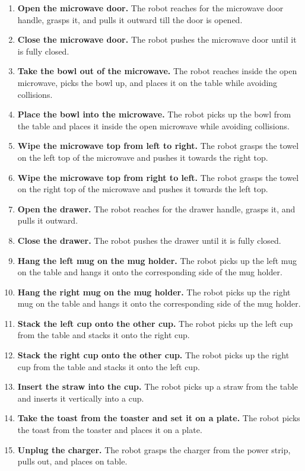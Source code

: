 \documentclass{llmxive}
\begin{document}
\begin{enumerate}[leftmargin=1.6em,itemsep=0.1em]
    \item \textbf{Open the microwave door.} The robot reaches for the microwave door handle, grasps it, and pulls it outward till the door is opened.
    \item \textbf{Close the microwave door.} The robot pushes the microwave door until it is fully closed.
    \item \textbf{Take the bowl out of the microwave.} The robot reaches inside the open microwave, picks the bowl up, and places it on the table while avoiding collisions.
    \item \textbf{Place the bowl into the microwave.} The robot picks up the bowl from the table and places it inside the open microwave while avoiding collisions.
    \item \textbf{Wipe the microwave top from left to right.} The robot grasps the towel on the left top of the microwave and pushes it towards the right top.
    \item \textbf{Wipe the microwave top from right to left.} The robot grasps the towel on the right top of the microwave and pushes it towards the left top.
    \item \textbf{Open the drawer.} The robot reaches for the drawer handle, grasps it, and pulls it outward.
    \item \textbf{Close the drawer.} The robot pushes the drawer until it is fully closed.
    \item \textbf{Hang the left mug on the mug holder.} The robot picks up the left mug on the table and hangs it onto the corresponding side of the mug holder.
    \item \textbf{Hang the right mug on the mug holder.} The robot picks up the right mug on the table and hangs it onto the corresponding side of the mug holder.
    \item \textbf{Stack the left cup onto the other cup.} The robot picks up the left cup from the table and stacks it onto the right cup.
    \item \textbf{Stack the right cup onto the other cup.} The robot picks up the right cup from the table and stacks it onto the left cup.
    \item \textbf{Insert the straw into the cup.} The robot picks up a straw from the table and inserts it vertically into a cup.
    \item \textbf{Take the toast from the toaster and set it on a plate.} The robot picks the toast from the toaster and places it on a plate.
    \item \textbf{Unplug the charger.} The robot grasps the charger from the power strip, pulls out, and places on table.
\end{enumerate}
\end{document}
